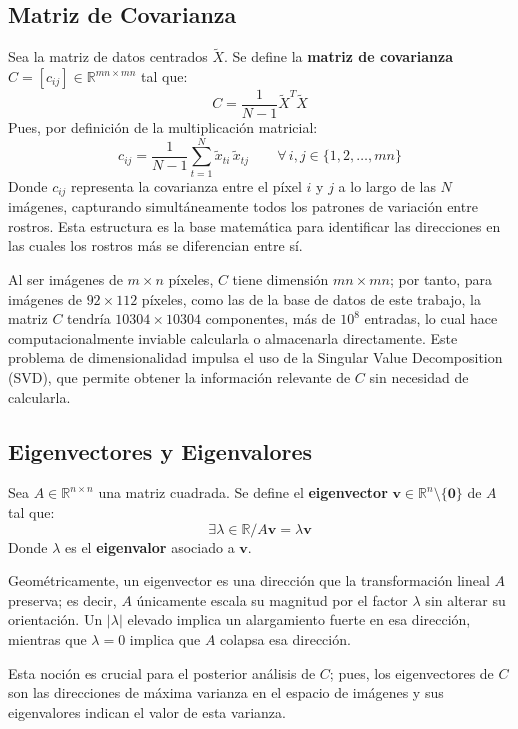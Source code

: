 \subsection{Matriz de Covarianza}

Sea la matriz de datos centrados $\tilde{X}$.
Se define la \textbf{matriz de covarianza} $C = [c_{ij}] \in \mathbb{R}^{mn \times mn}$
tal que:
\[
C = \frac{1}{N-1}\tilde{X}^T\tilde{X}
\]
Pues, por definición de la multiplicación matricial:
\[
c_{ij} = \frac{1}{N-1}\sum_{t=1}^{N} \tilde{x}_{ti}\,\tilde{x}_{tj}
\qquad \forall \, i, j \in \{1, 2, \dots, mn\}
\]
Donde $c_{ij}$ representa la covarianza entre el píxel $i$ y $j$
a lo largo de las $N$ imágenes, capturando simultáneamente todos los patrones
de variación entre rostros. Esta estructura es la base matemática para
identificar las direcciones en las cuales los rostros más se diferencian entre sí.

Al ser imágenes de $m \times n$ píxeles, $C$ tiene dimensión $mn \times mn$; por tanto,
para imágenes de $92 \times 112$ píxeles, como las de la base de datos de este trabajo,
la matriz $C$ tendría $10304 \times 10304$ componentes, más de $10^8$ entradas, lo cual
hace computacionalmente inviable calcularla o almacenarla directamente. Este problema de
dimensionalidad impulsa el uso de la Singular Value Decomposition (SVD), que permite
obtener la información relevante de $C$ sin necesidad de calcularla.


\subsection{Eigenvectores y Eigenvalores}

Sea $A \in \mathbb{R}^{n \times n}$ una matriz cuadrada. Se define el 
\textbf{eigenvector} $\mathbf{v} \in \mathbb{R}^n \setminus \{\mathbf{0}\}$ de $A$
tal que:
\[
\exists \lambda \in \mathbb{R} / A\mathbf{v} = \lambda\mathbf{v}
\]
Donde $\lambda$ es el \textbf{eigenvalor} asociado
a $\mathbf{v}$.

Geométricamente, un eigenvector es una dirección que la transformación
lineal $A$ preserva; es decir, $A$ únicamente escala su magnitud por el
factor $\lambda$ sin alterar su orientación. Un $|\lambda|$ elevado implica
un alargamiento fuerte en esa dirección, mientras que $\lambda = 0$ implica
que $A$ colapsa esa dirección.

Esta noción es crucial para el posterior análisis de $C$; pues, los eigenvectores
de $C$ son las direcciones de máxima varianza en el espacio de imágenes y sus
eigenvalores indican el valor de esta varianza.


